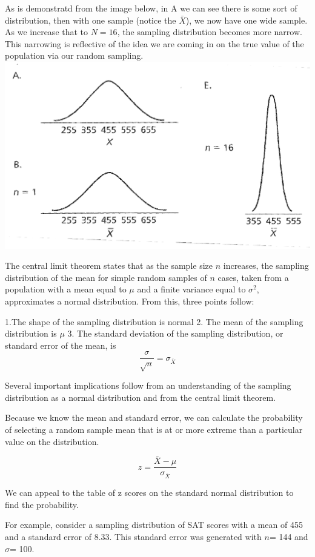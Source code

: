 \documentclass[]{book}
\theoremstyle{definition}
\theoremstyle{definition}
\theoremstyle{definition}
\theoremstyle{remark}
\begin{document}
As is demonstratd from the image below, in A we can see there is some
sort of distribution, then with one sample (notice the \(\bar{X}\)), we
now have one wide sample. As we increase that to \(N = 16\), the
sampling distribution becomes more narrow. This narrowing is reflective
of the idea we are coming in on the true value of the population via our
random sampling. \includegraphics{img/hickssampling2.png}

The central limit theorem states that as the sample size \(n\)
increases, the sampling distribution of the mean for simple random
samples of \(n\) cases, taken from a population with a mean equal to
\(\mu\) and a finite variance equal to \(\sigma^2\), approximates a
normal distribution. From this, three points follow:

1.The shape of the sampling distribution is normal 2. The mean of the
sampling distribution is \(\mu\) 3. The standard deviation of the
sampling distribution, or standard error of the mean, is
\[\frac{\sigma}{\sqrt{n}}= \sigma_\bar{X}\]

Several important implications follow from an understanding of the
sampling distribution as a normal distribution and from the central
limit theorem.

Because we know the mean and standard error, we can calculate the
probability of selecting a random sample mean that is at or more extreme
than a particular value on the distribution.

\[z = \frac{\bar{X}-\mu}{\sigma_\bar{X}}\]

We can appeal to the table of z scores on the standard normal
distribution to find the probability.

For example, consider a sampling distribution of SAT scores with a mean
of 455 and a standard error of 8.33. This standard error was generated
with \(n\)= 144 and \(\sigma\)= 100.
\end{document}
